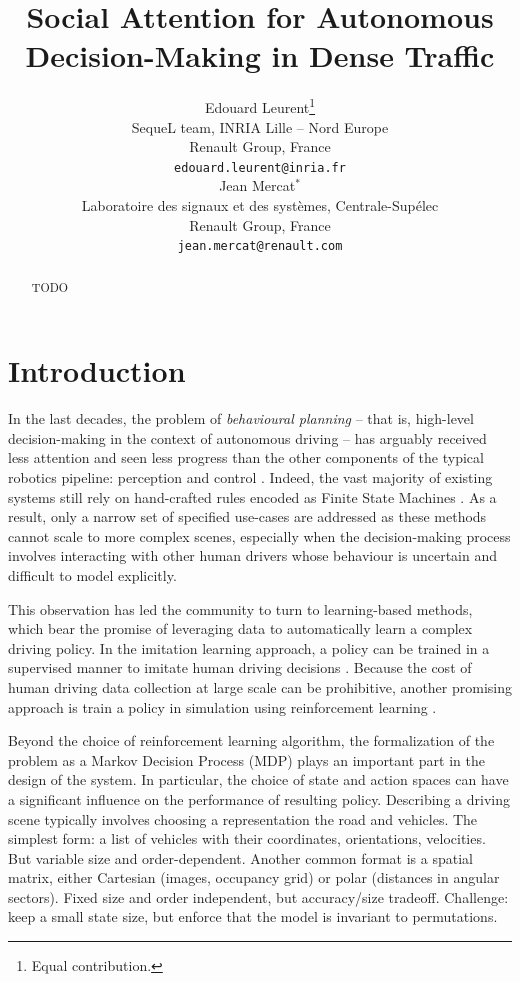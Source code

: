 \documentclass{article}
\title{Social Attention for Autonomous Decision-Making in Dense Traffic}
\author{%
  Edouard Leurent\thanks{Equal contribution.} \\
  SequeL team, INRIA Lille -- Nord Europe\\
  Renault Group, France\\
  \texttt{edouard.leurent@inria.fr} \\
   \And
  Jean Mercat$^*$ \\
  Laboratoire des signaux et des syst\`emes, Centrale-Sup\'elec\\
  Renault Group, France\\
  \texttt{jean.mercat@renault.com} \\
}
\begin{document}
	
	
	
	

\maketitle

\begin{abstract}
  TODO
\end{abstract}

\section{Introduction}

In the last decades, the problem of \emph{behavioural planning} -- that is, high-level decision-making in the context of autonomous driving -- has arguably received less attention and seen less progress than the other components of the typical robotics pipeline: perception and control \citep{Gonzalez2016}. Indeed, the vast majority of existing systems still rely on hand-crafted rules encoded as Finite State Machines \citep{Paden2016}. As a result, only a narrow set of specified use-cases are addressed as these methods cannot scale to more complex scenes, especially when the decision-making process involves interacting with other human drivers whose behaviour is uncertain and difficult to model explicitly.

This observation has led the community to turn to learning-based methods, which bear the promise of leveraging data to automatically learn a complex driving policy. In the imitation learning approach, a policy can be trained in a supervised manner to imitate human driving decisions \citep{Pomerleau1989, Ross2011, Bojarski2016, Xu2016, Eraqi2017, Codevilla2017, Rehder2017c, Rezagholiradeh2018, Bansal2018}. Because the cost of human driving data collection at large scale can be prohibitive, another promising approach is train a policy in simulation using reinforcement learning \citep{Cardamone2009, Ross2011}.

Beyond the choice of reinforcement learning algorithm, the formalization of the problem as a Markov Decision Process (MDP) plays an important part in the design of the system. In particular, the choice of state and action spaces can have a significant influence on the performance of resulting policy. Describing a driving scene typically involves choosing a representation the road and vehicles. The simplest form: a list of vehicles with their coordinates, orientations, velocities. But variable size and order-dependent. Another common format is a spatial matrix, either Cartesian (images, occupancy grid) or polar (distances in angular sectors). Fixed size and order independent, but accuracy/size tradeoff. Challenge: keep a small state size, but enforce that the model is invariant to permutations.
\end{document}
